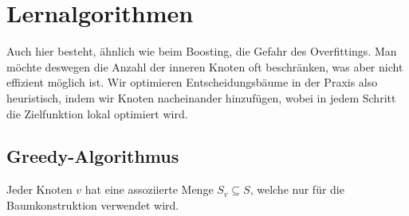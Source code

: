 \documentclass[language=ngerman,algolist,acrolist]{TemplateLecture}
\begin{document}
\section{Lernalgorithmen}
Auch hier besteht, ähnlich wie beim Boosting, die Gefahr des Overfittings. Man möchte deswegen die Anzahl der inneren Knoten oft beschränken, was aber nicht effizient möglich ist. Wir optimieren Entscheidungsbäume in der Praxis also heuristisch, indem wir Knoten nacheinander hinzufügen, wobei in jedem Schritt die Zielfunktion lokal optimiert wird. 

\subsection{Greedy-Algorithmus}

Jeder Knoten $v$ hat eine assoziierte Menge $S_v \subseteq S$, welche nur für die Baumkonstruktion verwendet wird.

\begin{algorithm}[h]
    \caption{\textsc{decisionTree}}\label{alg:decisionTree}
    \begin{algorithmic}[1]
        \EndFor{}
        \EndFor{}
    \end{algorithmic}
\end{algorithm}
\begin{algorithm}[h]
    \caption{\textsc{split}}\label{alg:split}
    \begin{algorithmic}[1]
    \end{algorithmic}
\end{algorithm}

\end{document}
